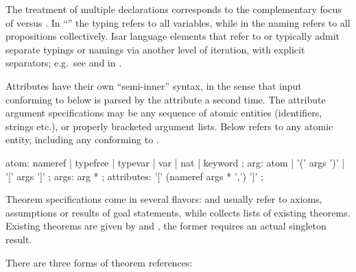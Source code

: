 \begin{isabellebody}
\begin{isamarkuptext}
  The treatment of multiple declarations corresponds to the
  complementary focus of  versus
  .  In ``''
  the typing refers to all variables, while in  the naming refers to all propositions collectively.
  Isar language elements that refer to  or
   typically admit separate typings or namings via
  another level of iteration, with explicit \hyperlink{keyword.and}{\mbox{}}
  separators; e.g.\ see \hyperlink{command.fix}{\mbox{}} and \hyperlink{command.assume}{\mbox{}} in
  .%
\end{isamarkuptext}%
\isamarkuptrue%
%
\isamarkuptrue%
%
\begin{isamarkuptext}%
Attributes have their own ``semi-inner'' syntax, in the sense
  that input conforming to  below is parsed by the
  attribute a second time.  The attribute argument specifications may
  be any sequence of atomic entities (identifiers, strings etc.), or
  properly bracketed argument lists.  Below  refers to
  any atomic entity, including any  conforming to
  .

  \begin{rail}
    atom: nameref | typefree | typevar | var | nat | keyword
    ;
    arg: atom | '(' args ')' | '[' args ']'
    ;
    args: arg *
    ;
    attributes: '[' (nameref args * ',') ']'
    ;
  \end{rail}

  Theorem specifications come in several flavors:
   and  usually refer to
  axioms, assumptions or results of goal statements, while
   collects lists of existing theorems.  Existing
  theorems are given by  and
  , the former requires an actual singleton
  result.

  There are three forms of theorem references:
  \begin{enumerate}
  

\end{enumerate}
\end{isamarkuptext}
\end{isabellebody}
